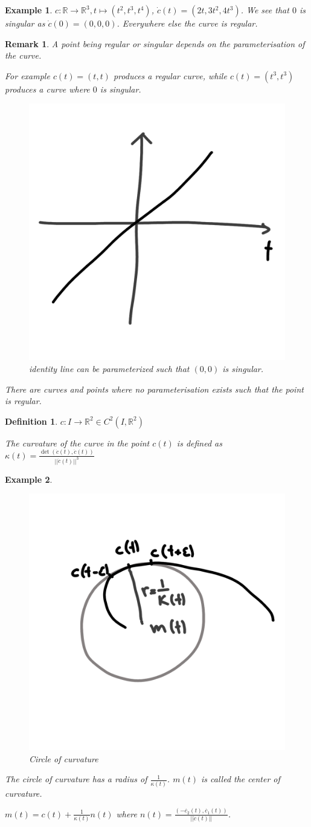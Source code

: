 \documentclass[]{article}
\newtheorem{definition}{Definition}
\newtheorem{example}{Example}
\newtheorem{remark}{Remark}
\begin{document}
\begin{example}
	$c:\mathbb{R} \rightarrow \mathbb{R}^3, t \mapsto (t^2, t^3, t^4)$, $\dot{c}(t) = (2t, 3t^2, 4t^3)$. We see that $0$ is singular as $\dot{c}(0) = (0, 0, 0)$. Everywhere else the curve is regular.
\end{example}

\begin{remark}
	A point being regular or singular depends on the parameterisation of the curve.
	
	For example $c(t) = (t,t)$ produces a regular curve, while $c(t) = (t^3, t^3)$ produces a curve where $0$ is singular.
	
	
	\begin{figure}[h!]
		\centering
		\includegraphics[width=0.3\linewidth]{figures/identity_line}
		\caption{identity line can be parameterized such that $(0, 0)$ is singular.}
		\label{fig:identityline}
	\end{figure}
	
	
	There are curves and points where no parameterisation exists such that the point is regular.	
\end{remark}

\begin{definition}
	$c: I \rightarrow \mathbb{R}^2 \in C^2(I, \mathbb{R}^2)$
	
	The curvature of the curve in the point $c(t)$ is defined as $\kappa(t) = \frac{\det(\dot{c}(t), \ddot{c}(t))}{||\dot{c}(t)||^3}$
\end{definition}

\begin{example}
	\begin{figure}[h!]
		\centering
		\includegraphics[width=0.3\linewidth]{figures/circle_of_curvature}
		\caption{Circle of curvature}
		\label{fig:circleofcurvature}
	\end{figure}
	
	The circle of curvature has a radius of $\frac{1}{\kappa(t)}$. $m(t)$ is called the center of curvature.
	
	$m(t) = c(t) + \frac{1}{\kappa(t)}n(t)$ where $n(t) = \frac{(-\dot{c_2}(t), \dot{c_1}(t))}{||\dot{c}(t)||}$.
\end{example}
\end{document}
